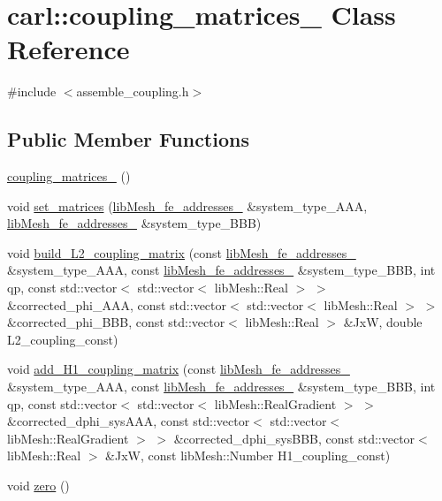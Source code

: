 \hypertarget{classcarl_1_1coupling__matrices__3}{}\section{carl\+:\+:coupling\+\_\+matrices\+\_ Class Reference}
\label{classcarl_1_1coupling__matrices__3}


{\ttfamily \#include $<$assemble\+\_\+coupling.\+h$>$}

\subsection*{Public Member Functions}
\begin{DoxyCompactItemize}
\item 
\hyperlink{classcarl_1_1coupling__matrices__3_ae0f3ff0a7b313c2905476c153c509fa6}{coupling\+\_\+matrices\+\_} ()
\item 
void \hyperlink{classcarl_1_1coupling__matrices__3_af3bb0a4c9c9cb246d968fb66a054f1c1}{set\+\_\+matrices} (\hyperlink{classcarl_1_1lib_mesh__fe__addresses__3}{lib\+Mesh\+\_\+fe\+\_\+addresses\+\_} \&system\+\_\+type\+\_\+\+A\+A\+A, \hyperlink{classcarl_1_1lib_mesh__fe__addresses__3}{lib\+Mesh\+\_\+fe\+\_\+addresses\+\_} \&system\+\_\+type\+\_\+\+B\+B\+B)
\item 
void \hyperlink{classcarl_1_1coupling__matrices__3_aa7833efcb14dae2535e50228cfc4e766}{build\+\_\+\+L2\+\_\+coupling\+\_\+matrix} (const \hyperlink{classcarl_1_1lib_mesh__fe__addresses__3}{lib\+Mesh\+\_\+fe\+\_\+addresses\+\_} \&system\+\_\+type\+\_\+\+A\+A\+A, const \hyperlink{classcarl_1_1lib_mesh__fe__addresses__3}{lib\+Mesh\+\_\+fe\+\_\+addresses\+\_} \&system\+\_\+type\+\_\+\+B\+B\+B, int qp, const std\+::vector$<$ std\+::vector$<$ lib\+Mesh\+::\+Real $>$ $>$ \&corrected\+\_\+phi\+\_\+\+A\+A\+A, const std\+::vector$<$ std\+::vector$<$ lib\+Mesh\+::\+Real $>$ $>$ \&corrected\+\_\+phi\+\_\+\+B\+B\+B, const std\+::vector$<$ lib\+Mesh\+::\+Real $>$ \&Jx\+W, double L2\+\_\+coupling\+\_\+const)
\item 
void \hyperlink{classcarl_1_1coupling__matrices__3_a0cd97b58bab0b49fa186ffe867bf1b18}{add\+\_\+\+H1\+\_\+coupling\+\_\+matrix} (const \hyperlink{classcarl_1_1lib_mesh__fe__addresses__3}{lib\+Mesh\+\_\+fe\+\_\+addresses\+\_} \&system\+\_\+type\+\_\+\+A\+A\+A, const \hyperlink{classcarl_1_1lib_mesh__fe__addresses__3}{lib\+Mesh\+\_\+fe\+\_\+addresses\+\_} \&system\+\_\+type\+\_\+\+B\+B\+B, int qp, const std\+::vector$<$ std\+::vector$<$ lib\+Mesh\+::\+Real\+Gradient $>$ $>$ \&corrected\+\_\+dphi\+\_\+sys\+A\+A\+A, const std\+::vector$<$ std\+::vector$<$ lib\+Mesh\+::\+Real\+Gradient $>$ $>$ \&corrected\+\_\+dphi\+\_\+sys\+B\+B\+B, const std\+::vector$<$ lib\+Mesh\+::\+Real $>$ \&Jx\+W, const lib\+Mesh\+::\+Number H1\+\_\+coupling\+\_\+const)
\item 
void \hyperlink{classcarl_1_1coupling__matrices__3_a28adf050c759db949c8f0cad8c0e2a7a}{zero} ()
\end{DoxyCompactItemize}
